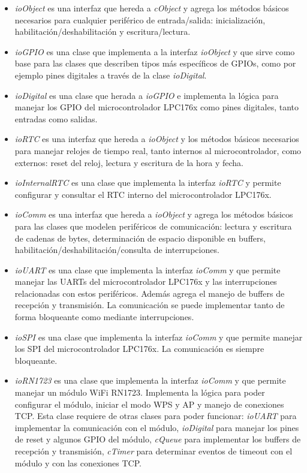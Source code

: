 \begin{itemize}
\item \textit{ioObject} es una interfaz que hereda a \textit{cObject} y agrega los métodos básicos necesarios para cualquier periférico de entrada/salida: inicialización, habilitación/deshabilitación y escritura/lectura.

\item \textit{ioGPIO} es una clase que implementa a la interfaz \textit{ioObject} y que sirve como base para las clases que describen tipos más específicos de GPIOs, como por ejemplo pines digitales a través de la clase \textit{ioDigital}.

\item \textit{ioDigital} es una clase que herada a \textit{ioGPIO} e implementa la lógica para manejar los GPIO del microcontrolador LPC176x como pines digitales, tanto entradas como salidas.

\item \textit{ioRTC} es una interfaz que hereda a \textit{ioObject} y los métodos básicos necesarios para manejar relojes de tiempo real, tanto internos al microcontrolador, como externos: reset del reloj, lectura y escritura de la hora y fecha.

\item \textit{ioInternalRTC} es una clase que implementa la interfaz \textit{ioRTC} y permite configurar y consultar el RTC interno del microcontrolador LPC176x.

\item \textit{ioComm} es una interfaz que hereda a \textit{ioObject} y agrega los métodos básicos para las clases que modelen periféricos de comunicación: lectura y escritura de cadenas de bytes, determinación de espacio disponible en buffers, habilitación/deshabilitación/consulta de interrupciones.

\item \textit{ioUART} es una clase que implementa la interfaz \textit{ioComm} y que permite manejar las UARTs del microcontrolador LPC176x y las interrupciones relacionadas con estos periféricos. Además agrega el manejo de buffers de recepción y transmisión. La comunicación se puede implementar tanto de forma bloqueante como mediante interrupciones.

\item \textit{ioSPI} es una clase que implementa la interfaz \textit{ioComm} y que permite manejar los SPI del microcontrolador LPC176x. La comunicación es siempre bloqueante.

\item \textit{ioRN1723} es una clase que implementa la interfaz \textit{ioComm} y que permite manejar un módulo WiFi RN1723. Implementa la lógica para poder configurar el módulo, iniciar el modo WPS y AP y manejo de conexiones TCP. Esta clase requiere de otras clases para poder funcionar: \textit{ioUART} para implementar la comunicación con el módulo, \textit{ioDigital} para manejar los pines de reset y algunos GPIO del módulo, \textit{cQueue} para implementar los buffers de recepción y transmisión, \textit{cTimer} para determinar eventos de timeout con el módulo y con las conexiones TCP.


\end{itemize}
